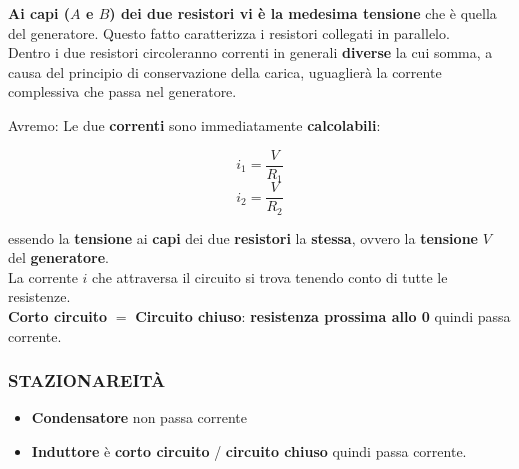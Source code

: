 \documentclass{article}
\begin{document}
\textbf{Ai capi ($A$ e $B$) dei due resistori vi è la medesima tensione} che è quella del generatore. Questo fatto caratterizza i resistori collegati in parallelo.\\
Dentro i due resistori circoleranno correnti in generali \textbf{diverse} la cui somma, a causa del principio di conservazione della carica, uguaglierà la corrente complessiva che passa nel generatore.

Avremo: 
Le due \textbf{correnti} sono immediatamente \textbf{calcolabili}:

\begin{equation}
  i_1=\frac{V}{R_1}
\end{equation}
\begin{equation}
  i_2=\frac{V}{R_2}
\end{equation}

essendo la \textbf{tensione} ai \textbf{capi} dei due \textbf{resistori} la \textbf{stessa}, ovvero la \textbf{tensione} $V$ del \textbf{generatore}.\\
La corrente $i$ che attraversa il circuito si trova tenendo conto di tutte le resistenze. \\
\textbf{Corto circuito} $=$ \textbf{Circuito chiuso}: \textbf{resistenza prossima allo 0} quindi passa corrente.\\





\pagebreak

\subsubsection{STAZIONAREITÀ}
\begin{itemize}
  \item \textbf{Condensatore} non passa corrente
  \item \textbf{Induttore} è \textbf{corto circuito} / \textbf{circuito chiuso} quindi passa corrente.
\end{itemize}
\end{document}
